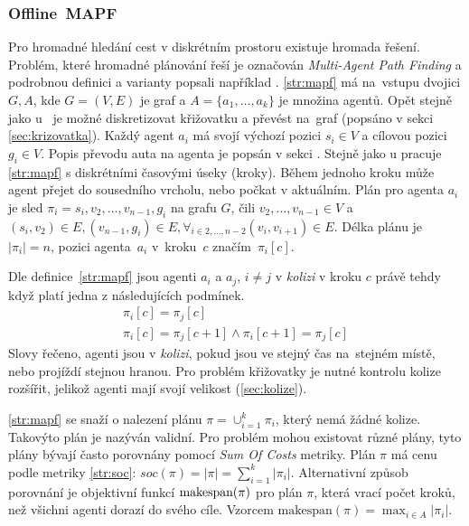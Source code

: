 \subsubsection{Offline~MAPF}\label{subsubsec:offline_mapf}

%

Pro hromadné hledání cest v diskrétním prostoru existuje hromada řešení.
Problém, které hromadné plánování řeší je označován \emph{Multi-Agent Path Finding} 
a podrobnou definici a varianty popsali například \citet*{osti_10114869}.
\ref{str:mapf} má na~vstupu dvojici $G, A$, kde $G=(V, E)$ je graf a $A = \{a_1, \dots, a_k\}$ je množina agentů.
Opět stejně jako u~ je možné diskretizovat křižovatku
a převést na~graf (popsáno v sekci \ref{sec:krizovatka}).
Každý agent $a_i$ má svojí výchozí pozici $s_i \in V$ a cílovou pozici $g_i \in V$.
Popis převodu auta na agenta je popsán v sekci .
Stejně jako u  pracuje \ref{str:mapf} s diskrétními časovými úseky (kroky).
Během jednoho kroku může agent přejet do sousedního vrcholu, nebo počkat v aktuálním.
Plán pro agenta $a_i$ je sled $\pi_i = s_i, v_2, \dots, v_{n-1}, g_i$ na grafu $G$, čili $v_2, \dots, v_{n-1} \in V$ a
$(s_i, v_2) \in E, (v_{n-1}, g_i) \in E, \forall_{i \in 2, \dots, n-2} (v_i, v_{i+1}) \in E$.
Délka plánu je $|\pi_i| = n$, pozici agenta~$a_i$ v~kroku~$c$ značím~$\pi_i[c]$.

Dle definice~\ref{str:mapf} jsou agenti $a_i$ a $a_j$, $i \neq j$ v \emph{kolizi} v kroku $c$
právě tehdy když platí jedna z následujících podmínek.
\begin{gather}
	\pi_i[c] = \pi_j[c] \label{eq:mapf_kolize_vrchol}\\
	\pi_i[c] = \pi_j[c + 1] \land \pi_i[c + 1] = \pi_j[c] \label{eq:mapf_kolize_hrana}
\end{gather}
Slovy řečeno, agenti jsou v \emph{kolizi}, pokud jsou ve stejný čas na~stejném místě, nebo projíždí stejnou hranou.
Pro problém křižovatky je nutné kontrolu kolize rozšířit, jelikož agenti mají svojí velikost (\ref{sec:kolize}).

\ref{str:mapf} se snaží o nalezení plánu $\pi = \cup_{i=1}^{k} \pi_i$, který nemá žádné kolize.
Takovýto plán je nazýván validní.
Pro problém mohou existovat různé plány, tyto plány bývají často porovnány pomocí \emph{Sum Of Costs}  metriky.
Plán $\pi$ má cenu podle metriky \ref{str:soc}: $soc(\pi) = |\pi| = \sum_{i=1}^{k} |\pi_i|$.
Alternativní způsob porovnání je objektivní funkcí $\textrm{makespan}\labeltext{makespan}{str:makespan}(\pi)$ pro plán $\pi$,
která vrací počet kroků, než všichni agenti dorazí do svého cíle.
Vzorcem $\textrm{makespan}(\pi)=\max_{i\in A} |\pi_i|$.

